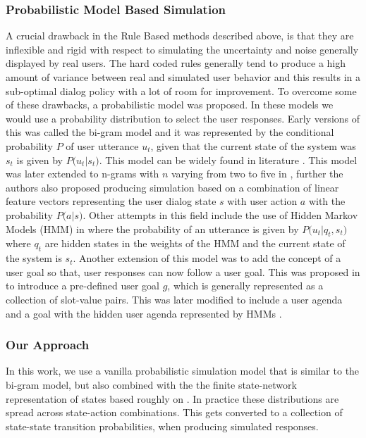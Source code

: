 \documentclass[14pt]{extarticle}
\numberwithin{equation}{section}
\begin{document}
	\subsubsection{Probabilistic Model Based Simulation}	
	A crucial drawback in the Rule Based methods described above, is that they are inflexible and rigid with respect to simulating the uncertainty and noise generally displayed by real users. The hard coded rules generally tend to produce a high amount of variance between real and simulated user behavior and this results in a sub-optimal dialog policy with a lot of room for improvement. To overcome some of these drawbacks, a probabilistic model was proposed. In these models we would use a probability distribution to select the user responses. Early versions of this was called the bi-gram model and it was represented by the conditional probability $P$ of user utterance $u_t$, given that the current state of the system was $s_t$ is given by $P\big(u_t|s_t\big)$. This model can be widely found in literature \cite{Cuayhuitl2006LearningMD}\cite{levin_mdp}\cite{4430164}. This model was later extended to n-grams with $n$ varying from two to five in \cite{Georgila2006UserSF}, further the authors also proposed producing simulation based on a combination of linear feature vectors representing the user dialog state $s$ with user action $a$ with the probability $P\big(a|s\big)$. Other attempts in this field include the use of Hidden Markov Models (HMM) in \cite{Cuayhuitl2005HumancomputerDS} where the probability of an utterance is given by $P\big(u_t|q_t,s_t\big)$ where $q_t$ are hidden states in the weights of the HMM and the current state of the system is $s_t$. Another extension of this model was to add the concept of a user goal so that, user responses can now follow a user goal. This was proposed in \cite{Scheffler_sim} to introduce a pre-defined user goal $g$, which is generally represented as a collection of slot-value pairs. This was later modified to include a user agenda and a goal with the hidden user agenda represented by HMMs \cite{Schatzmann2007StatisticalUS}.
	\subsubsection{Our Approach}
	In this work, we use a vanilla probabilistic simulation model that is similar to the bi-gram model, but also combined with the the finite state-network representation of states based roughly on \cite{Scheffler_sim}. In practice these distributions are spread across state-action combinations. This gets converted to a collection of state-state transition probabilities, when producing simulated responses.
\end{document}
